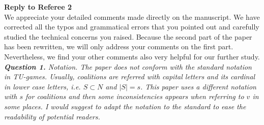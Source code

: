 \documentclass[11pt]{article}
\begin{document}
\noindent \textbf{\large Reply to Referee 2}
\\[3mm]
We appreciate your detailed comments made directly on the manuscript.
We have corrected all the typos and grammatical errors that you pointed out and carefully studied the technical concerns you raised.
Because the second part of the paper has been rewritten, we will only address your comments on the first part.
Nevertheless, we find your other comments also very helpful for our further study.
\\[4mm]
%
%
%
%
\noindent \textit{\textbf{Question 1.}
Notation. The paper does not conform with the standard notation in
TU-games. Usually, coalitions are referred with capital letters and its
cardinal in lower case letters, i.e. $S \subset N$ and $|S| = s$. This paper uses a different notation with $s$ for coalitions and then some inconsistencies
appears when referring to $v$ in some places. I would suggest to adapt
the notation to the standard to ease the readability of potential readers.}
\end{document}
